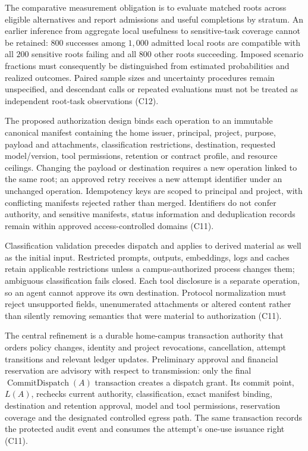 \documentclass[11pt]{article}
\begin{document}
The comparative measurement obligation is to evaluate matched roots across eligible alternatives and report admissions and useful completions by stratum. An earlier inference from aggregate local usefulness to sensitive-task coverage cannot be retained: $800$ successes among $1{,}000$ admitted local roots are compatible with all $200$ sensitive roots failing and all $800$ other roots succeeding. Imposed scenario fractions must consequently be distinguished from estimated probabilities and realized outcomes. Paired sample sizes and uncertainty procedures remain unspecified, and descendant calls or repeated evaluations must not be treated as independent root-task observations (C12).

The proposed authorization design binds each operation to an immutable canonical manifest containing the home issuer, principal, project, purpose, payload and attachments, classification restrictions, destination, requested model/version, tool permissions, retention or contract profile, and resource ceilings. Changing the payload or destination requires a new operation linked to the same root; an approved retry receives a new attempt identifier under an unchanged operation. Idempotency keys are scoped to principal and project, with conflicting manifests rejected rather than merged. Identifiers do not confer authority, and sensitive manifests, status information and deduplication records remain within approved access-controlled domains (C11).

Classification validation precedes dispatch and applies to derived material as well as the initial input. Restricted prompts, outputs, embeddings, logs and caches retain applicable restrictions unless a campus-authorized process changes them; ambiguous classification fails closed. Each tool disclosure is a separate operation, so an agent cannot approve its own destination. Protocol normalization must reject unsupported fields, unenumerated attachments or altered content rather than silently removing semantics that were material to authorization (C11).

The central refinement is a durable home-campus transaction authority that orders policy changes, identity and project revocations, cancellation, attempt transitions and relevant ledger updates. Preliminary approval and financial reservation are advisory with respect to transmission: only the final $\operatorname{CommitDispatch}(A)$ transaction creates a dispatch grant. Its commit point, $L(A)$, rechecks current authority, classification, exact manifest binding, destination and retention approval, model and tool permissions, reservation coverage and the designated controlled egress path. The same transaction records the protected audit event and consumes the attempt's one-use issuance right (C11).
\end{document}

